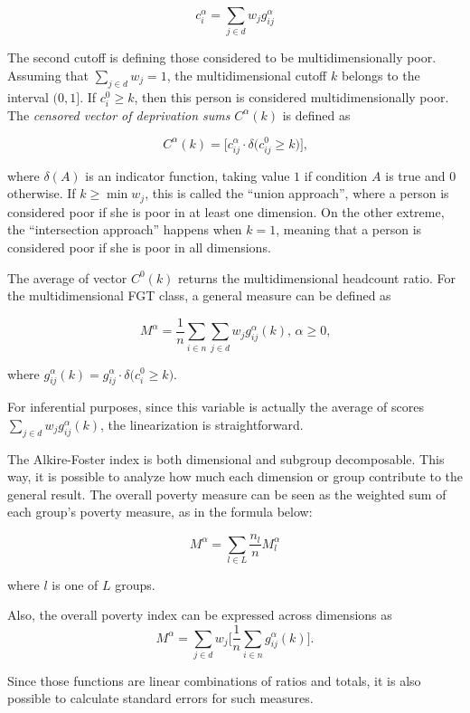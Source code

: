 \documentclass[]{book}
\begin{document}
\[
c^\alpha_{i} = \sum_{j \in d} w_j g_{ij}^\alpha
\]

The second cutoff is defining those considered to be multidimensionally
poor. Assuming that \(\sum_{j \in d} w_j = 1\), the multidimensional
cutoff \(k\) belongs to the interval \((0,1]\). If
\(c^0_{i} \geqslant k\), then this person is considered
multidimensionally poor. The \emph{censored vector of deprivation sums}
\(C^\alpha(k)\) is defined as

\[
C^\alpha (k) = \bigg[ c_{ij}^\alpha \cdot \delta \big( c_{ij}^0 \geqslant k \big) \bigg] \text{,}
\]

where \(\delta(A)\) is an indicator function, taking value \(1\) if
condition \(A\) is true and \(0\) otherwise. If
\(k \geqslant \min{ w_j }\), this is called the ``union approach'',
where a person is considered poor if she is poor in at least one
dimension. On the other extreme, the ``intersection approach'' happens
when \(k = 1\), meaning that a person is considered poor if she is poor
in all dimensions.

The average of vector \(C^0 (k)\) returns the multidimensional headcount
ratio. For the multidimensional FGT class, a general measure can be
defined as

\[
M^\alpha = \frac{1}{n} \sum_{i \in n} \sum_{j \in d} w_j g_{ij}^{\alpha}(k) \text{, } \alpha \geq 0 \text{,}
\]

where
\(g_{ij}^{\alpha}(k) = g_{ij}^\alpha \cdot \delta \big( c^0_i \geqslant k \big)\).

For inferential purposes, since this variable is actually the average of
scores \(\sum_{j \in d} w_j g_{ij}^{\alpha}(k)\), the linearization is
straightforward.

The Alkire-Foster index is both dimensional and subgroup decomposable.
This way, it is possible to analyze how much each dimension or group
contribute to the general result. The overall poverty measure can be
seen as the weighted sum of each group's poverty measure, as in the
formula below:

\[
M^\alpha = \sum_{l \in L} \frac{ n_l }{ n } M^\alpha_{l}
\]

where \(l\) is one of \(L\) groups.

Also, the overall poverty index can be expressed across dimensions as \[
M^\alpha = \sum_{j \in d} w_j \bigg[ \frac{1}{n} \sum_{i \in n} g_{ij}^\alpha (k) \bigg] \text{.}
\]

Since those functions are linear combinations of ratios and totals, it
is also possible to calculate standard errors for such measures.
\end{document}
